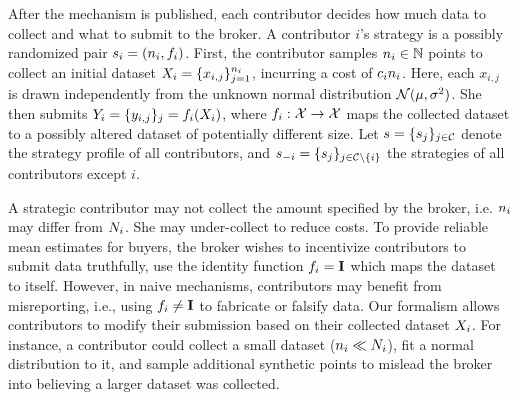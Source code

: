 

After the mechanism is published, each contributor decides how much data to collect and what to submit to the broker. A contributor $i$'s strategy is a possibly randomized pair $s_i = (n_i, f_i)$. First, the contributor samples $n_i \in \mathbb{N}$ points to collect an initial dataset $X_{i} = \{x_{i,j}\}_{j=1}^{n_i}$, incurring a cost of $c_i n_i$. Here, each $x_{i,j}$ is drawn independently from the unknown normal distribution
$\mathcal{N}(\mu,\sigma^2)$.
She then submits $Y_{i} = \{y_{i,j}\}_j = f_i(X_{i})$, where $f_i : \mathcal{X} \to \mathcal{X}$ maps the collected dataset to a possibly altered dataset of potentially different size.  
Let $s = \{s_j\}_{j \in \mathcal{C}}$ denote the strategy profile of all contributors, and $s_{-i} = \{s_j\}_{j \in \mathcal{C} \setminus \{i\}}$ the strategies of all contributors except $i$.


A strategic contributor may not collect the amount specified by the broker, i.e. $n_i$ may differ from $N_i$.
She may under-collect to reduce costs.
To provide reliable mean estimates for buyers, 
the broker wishes to incentivize contributors to submit data truthfully, \ie 
use the identity function $f_i={\rm \bf I}$ which maps the dataset to itself.
However, in naive mechanisms, contributors may benefit from misreporting, i.e., using $f_i \neq {\rm \bf I}$ to fabricate or falsify data. 
Our formalism allows contributors to modify their submission based on their collected dataset $X_{i}$. For instance, a contributor could collect a small dataset ($n_i \ll N_i$), fit a normal distribution to it, and sample additional synthetic points to mislead the broker into believing a larger dataset was collected.  





